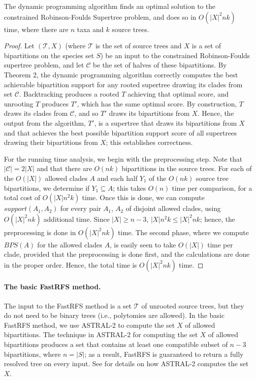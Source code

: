 \begin{theorem}
The dynamic programming algorithm finds an optimal solution
to the constrained Robinson-Foulds Supertree problem,
and does so in $O(|X|^2 nk)$ time, where there
are $n$ taxa and $k$ source trees.
\label{fastrfs::thm:main}
\end{theorem}
\begin{proof}
Let
$(\mathcal{T},X)$ (where $\mathcal{T}$ is the
set of source trees and $X$ is a set of bipartitions
on the species set $S$)
be an input 
to the constrained Robinson-Foulds supertree
problem, and let $\mathcal{C}$ be the set of
halves of these bipartitions.
By Theorem 2, 
the dynamic programming
algorithm correctly computes the  best
achievable bipartition support for any
rooted
supertree  drawing its clades
from set $\mathcal{C}$.
Backtracking produces a
rooted $T$ achieving that optimal score, and unrooting
$T$
produces $T'$, which has the same optimal score.
By construction, $T$ draws its clades from
$\mathcal{C}$, 
 and so $T'$ draws its bipartitions
from $X$.
Hence, the output from the
algorithm, $T'$, is a supertree
that
draws its bipartitions from $X$ and 
that
achieves the best possible bipartition
support score of all
supertrees drawing their bipartitions from $X$;
this establishes correctness.


For the running time analysis, we begin with the
preprocessing step. Note that
$|\mathcal{C}|=2|X|$ and that there
are $O(nk)$
bipartitions in the
source trees.
For each of the $O(|X|)$ allowed clades $A$ and
each half $Y_1$ of the $O(nk)$  source tree bipartitions, we
determine if $Y_1 \subseteq A$;
this takes $O(n)$ time per comparison, for a total cost of $O(|X|n^2k)$ time. 
Once this is done, we can compute $support(A_1,A_2)$ for
every pair $A_1$, $A_2$ of disjoint
allowed clades, using $O(|X|^2nk)$ additional time. 
Since $|X|\geq n-3$, 
$|X|n^2k \leq |X|^2 nk$; hence,
the preprocessing is done in $O(|X|^2 nk)$ time.
The second phase, where we compute
$BPS(A)$ for the  allowed clades $A$, is easily seen to take $O(|X|)$ time
per clade, provided that the preprocessing is done first, and
the calculations are done in the proper order.
Hence, the total time is
$O(|X|^2 nk)$ time. 
\end{proof}

\paragraph{\bf The basic FastRFS method.  }

The input to the FastRFS method is a set $\mathcal{T}$ of unrooted source trees,
but they do not need to be binary trees (i.e., 
polytomies are allowed).   
In the basic FastRFS method, we use ASTRAL-2 to compute the set
$X$ of allowed bipartitions.
The technique in ASTRAL-2
for computing the set $X$ of allowed bipartitions 
produces a set that contains at least one compatible subset of $n-3$ bipartitions,
where $n=|S|$; as a result,
FastRFS is guaranteed to return a fully resolved tree on every input.
See \cite{MirarabPhD} for details on how ASTRAL-2 computes the set $X$.






